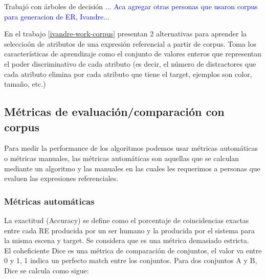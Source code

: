 Trabaj\'o con \'arboles de decisi\'on ...
\textcolor{blue}{Aca agregar otras personas que usaron corpus para generacion de ER, Ivandre... }

En el trabajo \ref{ivandre-work-corpus} presentan 2 alternativas para aprender la seleccio\'on de atributos de una expresi\'on referencial a partir de corpus. Toma los caracter\'isticas de aprendizaje como el conjunto de valores enteros que representan el poder discriminativo de cada atributo (es decir, el n\'umero de distractores que cada atributo elimina por cada atributo que tiene el target, ejemplos son color, tama\~no, etc.) 

\subsection{M\'etricas de evaluaci\'on/comparaci\'on con corpus}

Para medir la performance de los algoritmos podemos usar m\'etricas autom\'aticas o m\'etricas manuales, las m\'etricas autom\'aticas son aquellas que se calculan mediante un algoritmo y las manuales en las cuales les requerimos a personas que evaluen las expresiones referenciales.


\subsubsection{M\'etricas autom\'aticas}


La exactitud (Accuracy) se define como el porcentaje de coincidencias exactas entre cada RE producida por un ser humano y la producida por el sistema para la misma escena y target. Se considera que es una m\'etrica demasiado estricta.\\


El coheficiente Dice es una m\'etrica de comparaci\'on de conjuntos, el valor va entre 0 y 1, 1 indica un perfecto match entre los conjuntos. Para dos conjuntos A y B, Dice se calcula como sigue:\\


